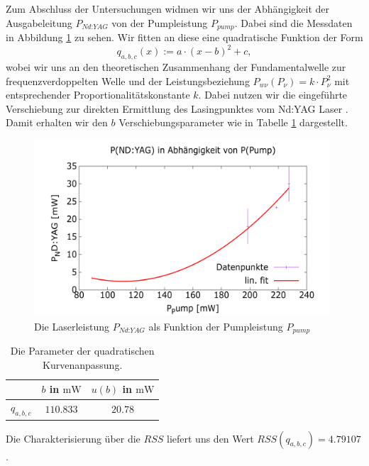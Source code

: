 \documentclass[../../main.tex]{subfiles}
\begin{document}
    Zum Abschluss der Untersuchungen widmen wir uns der Abhängigkeit der Ausgabeleitung $P_{\textit{Nd:YAG}}$ von der Pumpleistung $P_{\textit{pump}}$. Dabei sind die Messdaten in Abbildung \ref{fig:PumpLaserLeistung} zu sehen. Wir fitten an diese eine quadratische Funktion der Form
    \[
        q_{a,b,c}(x) := a\cdot (x - b)^2 + c,
    \]
    wobei wir uns an den theoretischen Zusammenhang der Fundamentalwelle zur frequenzverdoppelten Welle und der Leistungsbeziehung $P_{w\nu}(P_\nu) = k\cdot P_\nu^2$ mit entsprechender Proportionalitätskonstante $k$. Dabei nutzen wir die eingeführte Verschiebung zur direkten Ermittlung des Lasingpunktes vom Nd:YAG Laser \cite[p. 19]{doc:experiment08}. Damit erhalten wir den $b$ Verschiebungsparameter wie in Tabelle \ref{tab:PumpLaserLeistungFitParameter} dargestellt.
    \begin{figure}[H]
        \centering
        \includegraphics[width=11cm]{../../Bilddateien/7-2/P(NDYAG)overP(Pump).png}
        \caption{Die Laserleistung $P_{\textit{Nd:YAG}}$ als Funktion der Pumpleistung $P_{\textit{pump}}$}
        \label{fig:PumpLaserLeistung}
    \end{figure}
    \begin{table}[H]
        \centering
        \begin{tabular}{c|cc}
            \hline
             & $b$ in $\si{\mW}$ & $u(b)$ in $\si{\mW}$ \\
            \hline\hline
            $q_{a, b, c}$ & $110.833$ & $20.78$
        \end{tabular}
        \caption{Die Parameter der quadratischen Kurvenanpassung.}
        \label{tab:PumpLaserLeistungFitParameter}
    \end{table}
    Die Charakterisierung über die $RSS$ liefert uns den Wert $RSS(q_{a,b,c}) = 4.79107$.
\end{document}
